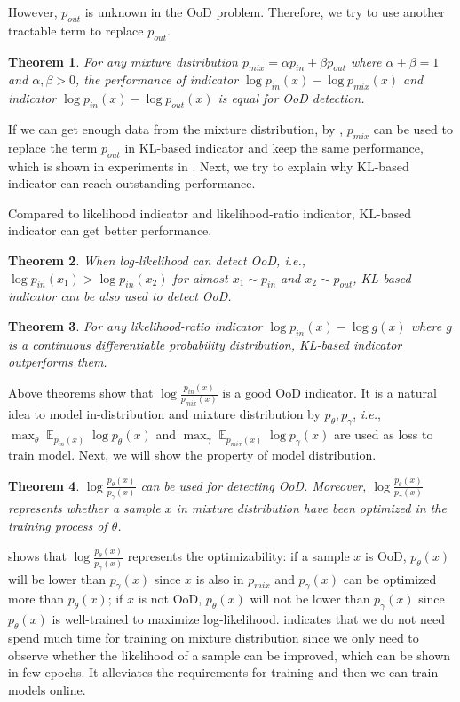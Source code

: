 \documentclass[letterpaper]{article} %
\newtheorem{theorem}{Theorem}
\newcommand{\IE}{\textit{i.e.}, }
\newcommand{\E}{\operatorname{\mathbb{E}}}
\newcommand{\pin}{p_{in}}
\newcommand{\pout}{p_{out}}
\newcommand{\pmix}{p_{mix}}
\begin{document}
However, $\pout$ is unknown in the OoD problem. Therefore, we try to use another tractable term to replace $\pout$. 

\begin{theorem}\label{thm2}
	For any mixture distribution $\pmix = \alpha \pin + \beta \pout$ where $\alpha + \beta = 1$ and $\alpha, \beta > 0$, the performance of indicator $\log \pin(x) - \log \pmix(x)$ and indicator $\log \pin(x) - \log \pout(x)$ is equal for OoD detection. 
\end{theorem}

If we can get enough data from the mixture distribution, by , $\pmix$ can be used to replace the term $\pout$ in KL-based indicator and keep the same performance, which is shown in experiments in . Next, we try to explain why KL-based indicator can reach outstanding performance.

Compared to likelihood indicator and likelihood-ratio indicator, KL-based indicator can get better performance. 
\begin{theorem}\label{thm3}
When log-likelihood can detect OoD, \IE $\log \pin(x_1) > \log \pin(x_2)$ for almost $x_1 \sim \pin$ and $x_2 \sim \pout$, KL-based indicator can be also used to detect OoD. 
\end{theorem}

\begin{theorem}\label{thm4}
For any likelihood-ratio indicator $\log \pin(x) - \log g(x)$ where $g$ is a continuous differentiable probability distribution, KL-based indicator outperforms them. 
\end{theorem}

Above theorems show that $\log \frac{\pin(x)}{\pmix(x)}$ is a good OoD indicator. It is a natural idea to model in-distribution and mixture distribution by $p_\theta, p_\gamma$, \IE $\max_\theta \E_{\pin(x)} \log p_\theta(x)$ and $\max_\gamma \E_{\pmix(x)} \log p_\gamma(x)$ are used as loss to train model. 
Next, we will show the property of model distribution. 

\begin{theorem}\label{thm5}
	$\log \frac{p_\theta(x)}{p_\gamma(x)}$ can be used for detecting OoD. Moreover, $\log \frac{p_\theta(x)}{p_\gamma(x)}$ represents whether a sample $x$ in mixture distribution have been optimized in the training process of $\theta$. 
\end{theorem}

 shows that $\log \frac{p_\theta(x)}{p_\gamma(x)}$ represents the optimizability: if a sample $x$ is OoD, $p_\theta(x)$ will be lower than $p_\gamma(x)$ since $x$ is also in $\pmix$ and $p_\gamma(x)$ can be optimized more than $p_\theta(x)$; if $x$ is not OoD, $p_\theta(x)$ will not be lower than $p_\gamma(x)$ since $p_\theta(x)$ is well-trained to maximize log-likelihood.  indicates that we do not need spend much time for training on mixture distribution since we only need to observe whether the likelihood of a sample can be improved, which can be shown in few epochs. It alleviates the requirements for training and then we can train models online. 
\end{document}
